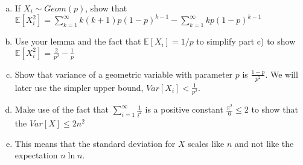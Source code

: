 \documentclass[11pt]{article}
\newif\ifsolutions
\begin{document}
\begin{enumerate}
\begin{enumerate}[a)]
\item If $X_i \sim Geom(p)$, show that $\mathbb{E}[X_i^2] = \sum\nolimits_{k=1}^{\infty} k(k+1)p(1-p)^{k-1} - \sum\nolimits_{k=1}^{\infty} kp(1-p)^{k-1}$

\ifsolutions{\color{blue}{
By definition $\mathbb{E}[X_i^2] = \sum\nolimits_{k=1}^{\infty} k^2p(1-p)^{k-1}$. Since $k^2 = k(k+1) - k$, we can plug that in to get the answer. 
}}\fi


\item Use your lemma and the fact that $\mathbb{E}[X_i] = 1/p$ to simplify part c) to show $\mathbb{E}[X_i^2] = \frac{2}{p^2} - \frac{1}{p} $

\ifsolutions{\color{blue}{
We simply plug in our lemma to the first sum term in part c). We also notice that the second sum term is just the expectation of a geometric variable with parameter $p$. So, we get 
\[ \mathbb{E}[X_i^2] = p\cdot \frac{2}{p^3} - \frac{1}{p} \]
}}\fi


\item Show that variance of a geometric variable with parameter $p$ is
  $\frac{1-p}{p^2}$. We will later use the simpler upper bound, $Var[X_i] < \frac{1}{p^2}$.

\ifsolutions{\color{blue}{
\begin{align*}
Var[X_i] &= \mathbb{E}[X_i^2] - \mathbb{E}[X_i]^2 \\ 
&= \frac{2}{p^2} - \frac{1}{p}  - (\frac{1}{p})^2 \\
&= \frac{1}{p^2} - \frac{1}{p} \\
&= \frac{1-p}{p^2} < \frac{1}{p^2}
\end{align*}
}}\fi


\item Make use of the fact that $\sum\nolimits_{i=1}^{\infty}
  \frac{1}{i^2}$ is a positive constant $\frac{\pi^2}{6} \leq 2$ to show that the $Var[X] \leq 2n^2$ 

\ifsolutions{\color{blue}{
We use the fact that the $X_i$'s are independent, 
\begin{align*}
Var[X] &= \sum\nolimits_{i=0}^{n-1} Var[X_i] \\ 
&\leq \sum\nolimits_{i=0}^{n-1} (\frac{n}{n-i})^2 \\
&= n^2\sum\nolimits_{i=0}^{n-1} \frac{1}{i}^2 \\
&\leq n^2\sum\nolimits_{i=0}^{\infty} \frac{1}{i}^2 \\
&\leq 2n^2
\end{align*}
}}\fi

\item This means that the standard deviation for $X$ scales like $n$
  and not like the expectation $n \ln n$. 


\end{enumerate}
\end{enumerate}
\end{document}
